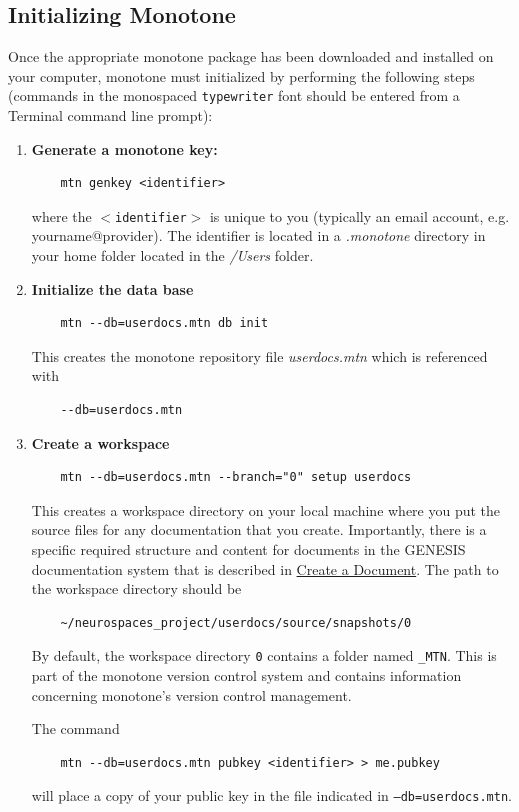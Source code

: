 \documentclass[12pt]{article}
\begin{document}
\subsection*{Initializing Monotone}

Once the appropriate monotone package has been downloaded and installed on your computer, monotone must  initialized by performing the following steps (commands in the monospaced {\tt typewriter} font should be entered from a Terminal command line prompt):

\begin{enumerate}

\item {\bf Generate a monotone key:} 
\begin{verbatim}
    mtn genkey <identifier>
\end{verbatim}
where the {\tt $<$identifier$>$} is unique to you (typically an email account, e.g. yourname@provider). The identifier is located in a {\it .monotone} directory in your home folder located in the {\it /Users} folder.

\item {\bf Initialize the data base}
\begin{verbatim}
    mtn --db=userdocs.mtn db init
\end{verbatim}
This creates the monotone repository file {\it userdocs.mtn} which is referenced with
\begin{verbatim}
    --db=userdocs.mtn
\end{verbatim}

\item {\bf Create a workspace}
\begin{verbatim}
    mtn --db=userdocs.mtn --branch="0" setup userdocs
\end{verbatim}
This creates a workspace directory on your local machine where you put the source files for any documentation that you create. Importantly, there is a specific required structure and content for documents in the GENESIS documentation system that is described in \href{../document-create/document-create.pdf}{Create a Document}. The path to the workspace directory should be
\begin{verbatim}
    ~/neurospaces_project/userdocs/source/snapshots/0
\end{verbatim}
By default, the workspace directory {\tt 0} contains a folder named {\tt \_MTN}. This is part of the monotone version control system and contains information concerning monotone's version control management.

The command
\begin{verbatim}
    mtn --db=userdocs.mtn pubkey <identifier> > me.pubkey
\end{verbatim}
will place a copy of your public key in the file indicated in {\tt --db=userdocs.mtn}.
\end{enumerate}
\end{document}
